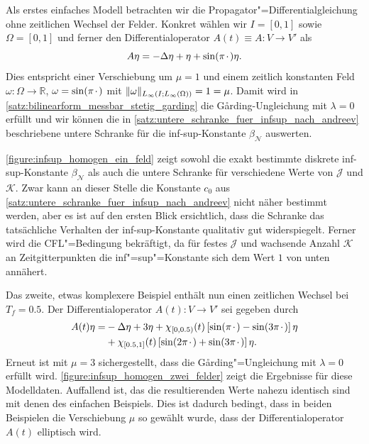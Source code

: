 \documentclass[../main.tex]{subfiles}
\begin{document}
Als erstes einfaches Modell betrachten wir die Propagator"=Differentialgleichung ohne zeitlichen Wechsel der Felder.
Konkret wählen wir $I = [0, 1]$ sowie $\Omega = [0, 1]$ und ferner den Differentialoperator $A(t) \equiv A \colon V \to V'$ als
\begin{equation}
    A \eta = - \Delta \eta + \eta + \sin(\pi {\mkern2mu\cdot\mkern2mu}) \eta.
\end{equation}
Dies entspricht einer Verschiebung um $\mu = 1$ und einem zeitlich konstanten Feld $\omega \colon \Omega \to \mathbb{R}$, $\omega = \sin(\pi {\mkern2mu\cdot\mkern2mu})$ mit $\lVert\omega\rVert_{L_{\infty}(I; L_{\infty}(\Omega))} = 1 = \mu$.
Damit wird in \cref{satz:bilinearform_messbar_stetig_garding} die G\aa{}rding-Ungleichung mit $\lambda = 0$ erfüllt und wir können die in \cref{satz:untere_schranke_fuer_infsup_nach_andreev} beschriebene untere Schranke für die inf-sup-Konstante $\beta_{\mathcal N}$ auswerten.

\cref{figure:infsup_homogen_ein_feld} zeigt sowohl die exakt bestimmte diskrete inf-sup-Konstante $\beta_{\mathcal N}$ als auch die untere Schranke für verschiedene Werte von $\mathcal J$ und $\mathcal K$.
Zwar kann an dieser Stelle die Konstante $c_{0}$ aus \cref{satz:untere_schranke_fuer_infsup_nach_andreev} nicht näher bestimmt werden, aber es ist auf den ersten Blick ersichtlich, dass die Schranke das tatsächliche Verhalten der inf-sup-Konstante qualitativ gut widerspiegelt.
Ferner wird die CFL"=Bedingung bekräftigt, da für festes $\mathcal J$ und wachsende Anzahl $\mathcal K$ an Zeitgitterpunkten die inf"=sup"=Konstante sich dem Wert $1$ von unten annähert.

Das zweite, etwas komplexere Beispiel enthält nun einen zeitlichen Wechsel bei $T_{f} = 0.5$.
Der Differentialoperator $A(t) \colon V \to V'$ sei gegeben durch
\begin{equation}
    \begin{aligned}
        A(t)\eta =
        &- \Delta \eta + 3 \eta + \chi_{[0, 0.5)}(t) \left[ \sin(\pi {\mkern2mu\cdot\mkern2mu}) - \sin(3 \pi {\mkern2mu\cdot\mkern2mu}) \right] \eta
        \\&+ \chi_{[0.5, 1]}(t) \left[ \sin(2 \pi {\mkern2mu\cdot\mkern2mu} ) + \sin(3 \pi {\mkern2mu\cdot\mkern2mu}) \right] \eta.
    \end{aligned}
\end{equation}
Erneut ist mit $\mu = 3$ sichergestellt, dass die G\aa{}rding"=Ungleichung mit $\lambda = 0$ erfüllt wird.
\cref{figure:infsup_homogen_zwei_felder} zeigt die Ergebnisse für diese Modelldaten.
Auffallend ist, das die resultierenden Werte nahezu identisch sind mit denen des einfachen Beispiels.
Dies ist dadurch bedingt, dass in beiden Beispielen die Verschiebung $\mu$ so gewählt wurde, dass der Differentialoperator $A(t)$ elliptisch wird.
\end{document}
